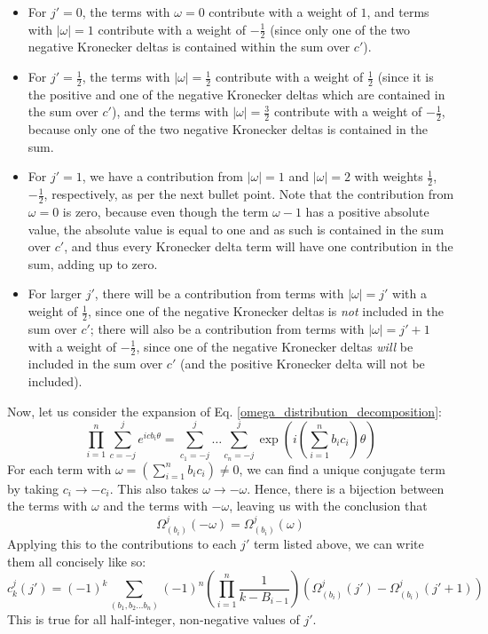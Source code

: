 \documentclass[12pt]{article}
\begin{document}
	\begin{itemize}
	\item For $j'=0$, the terms with $\omega=0$ contribute with a weight of $1$, and terms with $|\omega|= 1$ contribute with a weight of $-\frac{1}{2}$ (since only one of the two negative Kronecker deltas is contained within the sum over $c'$).
	\item For $j'=\frac{1}{2}$, the terms with $|\omega|=\frac{1}{2}$ contribute with a weight of $\frac{1}{2}$ (since it is the positive and one of the negative Kronecker deltas which are contained in the sum over $c'$), and the terms with $|\omega|=\frac{3}{2}$ contribute with a weight of $-\frac{1}{2}$, because only one of the two negative Kronecker deltas is contained in the sum.
	\item For $j'=1$, we have a contribution from $|\omega|=1$ and $|\omega|=2$ with weights $\frac{1}{2}$, $-\frac{1}{2}$, respectively, as per the next bullet point. Note that the contribution from $\omega = 0$ is zero, because even though the term $\omega-1$ has a positive absolute value, the absolute value is equal to one and as such is contained in the sum over $c'$, and thus every Kronecker delta term will have one contribution in the sum, adding up to zero.
	\item For larger $j'$, there will be a contribution from terms with $|\omega|=j'$ with a weight of $\frac{1}{2}$, since one of the negative Kronecker deltas is \textit{not} included in the sum over $c'$; there will also be a contribution from terms with $|\omega|=j'+1$ with a weight of $-\frac{1}{2}$, since one of the negative Kronecker deltas \textit{will} be included in the sum over $c'$ (and the positive Kronecker delta will not be included).
	\end{itemize}
	Now, let us consider the expansion of Eq. \ref{omega_distribution_decomposition}:
	\begin{equation}
	\prod_{i=1}^n \sum_{c=-j}^j e^{icb_i\theta}=\sum_{c_1=-j}^j\dots\sum_{c_n=-j}^j \exp(i\left(\sum_{i=1}^n b_ic_i\right)\theta)
	\end{equation}
	For each term with $\omega = \left(\sum_{i=1}^n b_ic_i\right)\neq 0$, we can find a unique conjugate term by taking $c_i\to-c_i$. This also takes $\omega\to-\omega$. Hence, there is a bijection between the terms with $\omega$ and the terms with $-\omega$, leaving us with the conclusion that
	\begin{equation}
	\Omega^j_{(b_i)}(-\omega)=\Omega^j_{(b_i)}(\omega)
	\end{equation}
	Applying this to the contributions to each $j'$ term listed above, we can write them all concisely like so:
	\begin{equation}
	c^j_k(j')=(-1)^k\sum_{(b_1, b_2\dots b_n)}(-1)^n\left(\prod_{i=1}^n \frac{1}{k-B_{i-1}}\right)\left(\Omega^j_{(b_i)}(j')-\Omega^j_{(b_i)}(j'+1)\right)
	\end{equation}
	This is true for all half-integer, non-negative values of $j'$.
	
	\begin{thebibliography}{10}



\end{thebibliography}	
	
\end{document}
